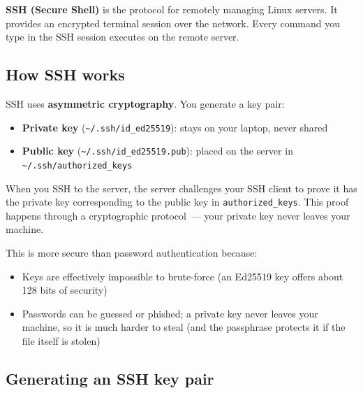 \textbf{SSH (Secure Shell)} is the protocol for remotely managing Linux servers. It provides an encrypted terminal session over the network. Every command you type in the SSH session executes on the remote server.

\subsection*{How SSH works}\label{21-system-setup:how-ssh-works}

SSH uses \textbf{asymmetric cryptography}. You generate a key pair:

\begin{itemize}
\tightlist
\item
  \textbf{Private key} (\texttt{\textasciitilde{}/.ssh/id\_ed25519}): stays on your laptop, never shared
\item
  \textbf{Public key} (\texttt{\textasciitilde{}/}\allowbreak{}\texttt{.ssh/}\allowbreak{}\texttt{id\_ed25519.pub}): placed on the server in \texttt{\textasciitilde{}/}\allowbreak{}\texttt{.ssh/}\allowbreak{}\texttt{authorized\_keys}
\end{itemize}

\noindent{}When you SSH to the server, the server challenges your SSH client to prove it has the private key corresponding to the public key in \texttt{authorized\_keys}. This proof happens through a cryptographic protocol~--- your private key never leaves your machine.

This is more secure than password authentication because:

\begin{itemize}
\tightlist
\item
  Keys are effectively impossible to brute-force (an Ed25519 key offers about 128 bits of security)
\item
  Passwords can be guessed or phished; a private key never leaves your machine, so it is much harder to steal (and the passphrase protects it if the file itself is stolen)
\end{itemize}

\subsection*{Generating an SSH key pair}\label{21-system-setup:generating-an-ssh-key-pair}

